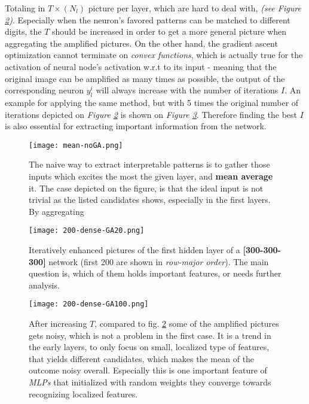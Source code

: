 Totaling in $T\times(N_l)$ picture per layer, which are hard to deal with, \emph{(see Figure \ref{fig:dense})}. 
Especially when the neuron's favored patterns can be matched to different digits, 
the $T$ should be increased in order to get a more general picture when aggregating the amplified pictures.
On the other hand, the gradient ascent optimization cannot terminate on \emph{convex functions}, which is actually true for the activation of neural node's activation w.r.t to its input - meaning that the original image can be amplified as many times as possible, the output of the corresponding neuron $y_l^i$ will always increase with the number of iterations $I$. An example for applying the same method, but with 5 times the original number of iterations depicted on \emph{Figure \ref{fig:dense}} is shown on \emph{Figure \ref{fig:dense-100}}.
Therefore finding the best $I$ is also essential for extracting important information from the network.


\begin{figure}
    \centering
    \texttt{[image: mean-noGA.png]}
    \caption{The naive way to extract interpretable patterns is to gather those inputs which excites the most the given layer, and \textbf{mean average} it. The case depicted on the figure, is that the ideal input is not trivial as the listed candidates shows, especially in the first layers. By aggregating}
    \label{fig:mean}
\end{figure}


\begin{figure}
    \centering
    \texttt{[image: 200-dense-GA20.png]}
    \caption{Iteratively enhanced pictures of the first hidden layer of a \textbf{[300-300-300]} network (first 200 are shown in \emph{row-major order}). The main question is, which of them holds important features, or needs further analysis.}
    \label{fig:dense}
\end{figure}


\begin{figure}
    \centering
    \texttt{[image: 200-dense-GA100.png]}
    \caption{After increasing $T$, compared to fig. \ref{fig:dense} some of the amplified pictures gets noisy, which is not a problem in the first case. It is a trend in the early layers, to only focus on small, localized type of features, that yields different candidates, which makes the mean of the outcome noisy overall. Especially this is one important feature of \emph{MLPs} that initialized with random weights they converge towards recognizing localized features.}
    \label{fig:dense-100}
\end{figure}